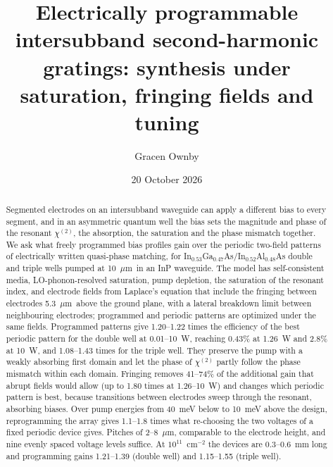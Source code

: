 \documentclass[11pt]{article}
\title{Electrically programmable intersubband second-harmonic gratings: synthesis under saturation, fringing fields and tuning}
\author{Gracen Ownby}
\affil{University of Oklahoma, Norman, Oklahoma, USA}
\date{\small 20 October 2026}
\newcommand{\chitwo}{\chi^{(2)}}
\newcommand{\um}{~$\mu$m}
\begin{document}
\maketitle

\begin{abstract}
Segmented electrodes on an intersubband waveguide can apply a different bias to every segment, and in an asymmetric quantum well the bias sets the magnitude and phase of the resonant $\chitwo$, the absorption, the saturation and the phase mismatch together. We ask what freely programmed bias profiles gain over the periodic two-field patterns of electrically written quasi-phase matching, for In$_{0.53}$Ga$_{0.47}$As/In$_{0.52}$Al$_{0.48}$As double and triple wells pumped at 10\um\ in an InP waveguide. The model has self-consistent media, LO-phonon-resolved saturation, pump depletion, the saturation of the resonant index, and electrode fields from Laplace's equation that include the fringing between electrodes 5.3\um\ above the ground plane, with a lateral breakdown limit between neighbouring electrodes; programmed and periodic patterns are optimized under the same fields. Programmed patterns give 1.20--1.22 times the efficiency of the best periodic pattern for the double well at 0.01--10~W, reaching 0.43\% at 1.26~W and 2.8\% at 10~W, and 1.08--1.43 times for the triple well. They preserve the pump with a weakly absorbing first domain and let the phase of $\chitwo$ partly follow the phase mismatch within each domain. Fringing removes 41--74\% of the additional gain that abrupt fields would allow (up to 1.80 times at 1.26--10~W) and changes which periodic pattern is best, because transitions between electrodes sweep through the resonant, absorbing biases. Over pump energies from 40~meV below to 10~meV above the design, reprogramming the array gives 1.1--1.8 times what re-choosing the two voltages of a fixed periodic device gives. Pitches of 2--8\um, comparable to the electrode height, and nine evenly spaced voltage levels suffice. At $10^{11}$~cm$^{-2}$ the devices are 0.3--0.6~mm long and programming gains 1.21--1.39 (double well) and 1.15--1.55 (triple well).
\end{abstract}
\end{document}

